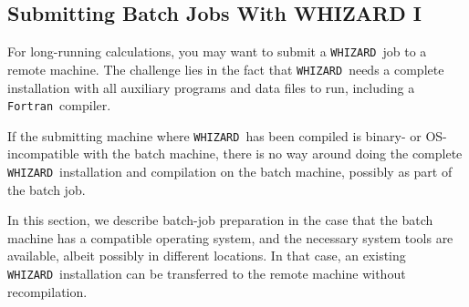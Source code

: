 \documentclass[12pt]{book}
\newcommand{\whizard}{\texttt{WHIZARD}}
\newcommand{\fortran}{\texttt{Fortran}}
\begin{document}
\subsection{Submitting Batch Jobs With WHIZARD I}
\label{sec:batch}

For long-running calculations, you may want to submit a \whizard\ job
to a remote machine.  The challenge lies in the fact that \whizard\
needs a complete installation with all auxiliary programs and data
files to run, including a \fortran\ compiler.

If the submitting machine where \whizard\ has been compiled is binary-
or OS-incompatible with the batch machine, there is no way around
doing the complete \whizard\ installation and compilation on the batch
machine, possibly as part of the batch job.

In this section, we describe batch-job preparation in the case that
the batch machine has a compatible operating system, and the necessary
system tools are available, albeit possibly in different locations.
In that case, an existing \whizard\ installation can be transferred to
the remote machine without recompilation.
\end{document}
